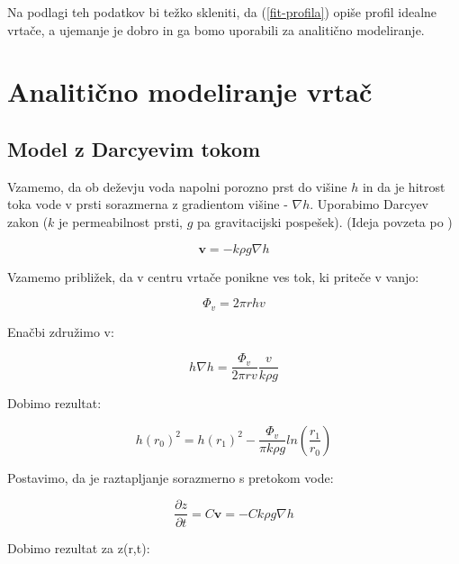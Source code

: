 \documentclass[a4paper, oneside, 12pt]{book}
\begin{document}
  Na podlagi teh podatkov bi težko skleniti, da (\ref{fit-profila}) opiše profil idealne vrtače, a ujemanje je dobro in ga bomo uporabili za analitično modeliranje. 


  \chapter{Analitično modeliranje vrtač}
  \label{analiticno-modeliranje}

  \section{Model z Darcyevim tokom}

  Vzamemo, da ob deževju voda napolni porozno prst do višine $h$ in da je hitrost toka vode v prsti sorazmerna z gradientom višine - $\nabla h$. Uporabimo Darcyev zakon ($k$ je permeabilnost prsti, $g$ pa gravitacijski pospešek). (Ideja povzeta po \cite{Kodre1994})

  \begin{equation}
    \mathbf{v} = - k \rho g \nabla h
    \label{darcyev-zakon}
  \end{equation}

  Vzamemo približek, da v centru vrtače ponikne ves tok, ki priteče v vanjo:

  \begin{equation}
    \Phi_v = 2 \pi r h v
    \label{darcy-tok}
  \end{equation}

  Enačbi združimo v:

  \begin{equation}
    h \nabla h = \frac{\Phi_v}{2 \pi r v} \frac{v}{k \rho g}
    \label{darcy-pretok-1}
  \end{equation}

  Dobimo rezultat:

  \begin{equation}
    h(r_0)^2 = h(r_1)^2 - \frac{\Phi_v}{\pi k \rho g} ln(\frac{r_1}{r_0})
    \label{darcy-gladina}
  \end{equation}

  Postavimo, da je raztapljanje sorazmerno s pretokom vode:

  \begin{equation}
    \frac{\partial z}{\partial t} = C \mathbf{v} = - C k \rho g \nabla h
    \label{darcy-raztapljanje-2}
  \end{equation}

  Dobimo rezultat za z(r,t):
\end{document}
